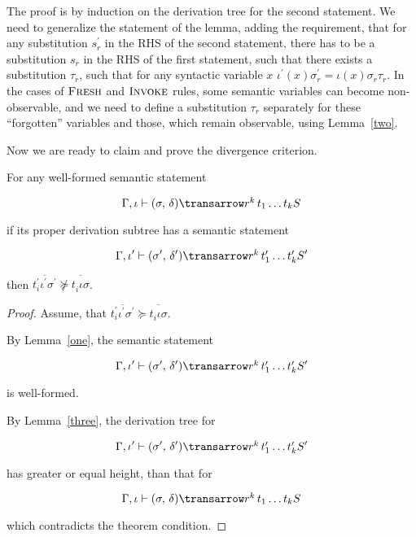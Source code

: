 The proof is by induction on the derivation tree for the second statement. We need to generalize the statement of the lemma, adding the requirement, that 
for any substitution $s^\prime_r$ in the RHS of the second statement, there has to be a substitution $s_r$ in the RHS of the first statement,
such that there exists a substitution $\tau_r$, such that for any syntactic variable $x$ \mbox{$\iota^\prime(x) \sigma^\prime_r = \iota(x) \sigma_r \tau_r$}. 
In the cases of $\textsc{Fresh}$ and $\textsc{Invoke}$ rules, some semantic variables can become non-observable, and we need to define a substitution $\tau_r$ 
separately for these ``forgotten'' variables and those, which remain observable, using Lemma~\ref{two}.

Now we are ready to claim and prove the divergence criterion.

\setcounter{theorem}{0}
\begin{theorem}
\label{criterion}
\normalfont
For any well-formed semantic statement 

$$
\otrans{\Gamma,\iota}{(\sigma,\,\delta)}{r^k\,t_1\dots t_k}{S}
$$ 

if its proper derivation subtree has a semantic statement 

$$
\otrans{\Gamma,\iota^\prime}{(\sigma^\prime,\,\delta^\prime)}{r^k\,t^\prime_1\dots t^\prime_k}{S^\prime}
$$

then \mbox{$\overline{t^\prime_i \iota^\prime \sigma^\prime} \not \succeq \overline{t^{\phantom{\prime}}_i \iota \sigma}$}. 
\end{theorem}
\begin{proof}
Assume, that \mbox{$\overline{t^\prime_i \iota^\prime \sigma^\prime}\succeq \overline{t^{\phantom{\prime}}_i \iota \sigma}$}. 

By Lemma~\ref{one}, the semantic statement

$$
\otrans{\Gamma,\iota^\prime}{(\sigma^\prime,\,\delta^\prime)}{r^k\,t^\prime_1\dots t^\prime_k}{S^\prime}
$$

\noindent is well-formed.

By Lemma~\ref{three}, the derivation tree for

$$
\otrans{\Gamma,\iota^\prime}{(\sigma^\prime,\,\delta^\prime)}{r^k\,t^\prime_1\dots t^\prime_k}{S^\prime}
$$

\noindent has greater or equal height, than that for

$$
\otrans{\Gamma,\iota}{(\sigma,\,\delta)}{r^k\,t_1\dots t_k}{S}
$$ 

\noindent which contradicts the theorem condition.

\end{proof}

